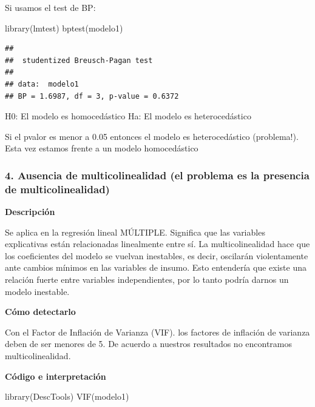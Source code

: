 \documentclass[
]{article}
\newenvironment{Shaded}{\begin{snugshade}}{\end{snugshade}}
\newcommand{\FunctionTok}[1]{\textcolor[rgb]{0.00,0.00,0.00}{#1}}
\newcommand{\NormalTok}[1]{#1}
\begin{document}
Si usamos el test de BP:

\begin{Shaded}
\begin{Highlighting}[]
\FunctionTok{library}\NormalTok{(lmtest)}
\FunctionTok{bptest}\NormalTok{(modelo1)}
\end{Highlighting}
\end{Shaded}

\begin{verbatim}
## 
##  studentized Breusch-Pagan test
## 
## data:  modelo1
## BP = 1.6987, df = 3, p-value = 0.6372
\end{verbatim}

H0: El modelo es homocedástico Ha: El modelo es heterocedástico

Si el pvalor es menor a 0.05 entonces el modelo es heterocedástico
(problema!). Esta vez estamos frente a un modelo homocedástico

\hypertarget{ausencia-de-multicolinealidad-el-problema-es-la-presencia-de-multicolinealidad}{%
\subsubsection{4. Ausencia de multicolinealidad (el problema es la
presencia de
multicolinealidad)}\label{ausencia-de-multicolinealidad-el-problema-es-la-presencia-de-multicolinealidad}}

\textbf{Descripción}

Se aplica en la regresión lineal MÚLTIPLE. Significa que las variables
explicativas están relacionadas linealmente entre sí. La
multicolinealidad hace que los coeficientes del modelo se vuelvan
inestables, es decir, oscilarán violentamente ante cambios mínimos en
las variables de insumo. Esto entendería que existe una relación fuerte
entre variables independientes, por lo tanto podría darnos un modelo
inestable.

\textbf{Cómo detectarlo}

Con el Factor de Inflación de Varianza (VIF). los factores de inflación
de varianza deben de ser menores de 5. De acuerdo a nuestros resultados
no encontramos multicolinealidad.

\textbf{Código e interpretación}

\begin{Shaded}
\begin{Highlighting}[]
\FunctionTok{library}\NormalTok{(DescTools)}
\FunctionTok{VIF}\NormalTok{(modelo1)}
\end{Highlighting}
\end{Shaded}
\end{document}
